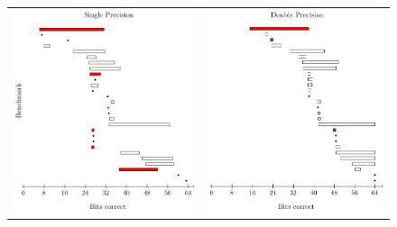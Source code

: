 \documentclass[paper.tex]{subfiles}
\begin{document}
\begin{figure}
  \begin{tabular}{cc}
    \includegraphics[width=0.9\columnwidth]{fig/eval-rect-f.pdf}
    &
    \includegraphics[width=0.9\columnwidth]{fig/eval-rect-d.pdf}

\end{tabular}
\end{figure}
\end{document}
